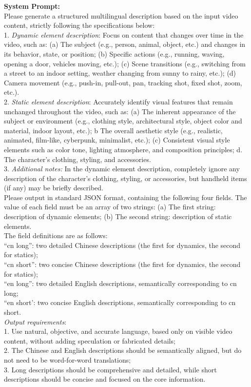 \documentclass{llmxive}
\begin{document}
\begin{tcolorbox}[
    colback=gray!10,
    colframe=gray!30,
    boxrule=0.3pt,
    arc=1.5pt,
    left=6pt,
    right=6pt,
    top=6pt,
    bottom=6pt
]
% 
\textbf{System Prompt:}
\\
Please generate a structured multilingual description based on the input video content, strictly following the specifications below:
\\
1. \textit{Dynamic element description}: Focus on content that changes over time in the video, such as: (a) The subject (e.g., person, animal, object, etc.) and changes in its behavior, state, or position; (b) Specific actions (e.g., running, waving, opening a door, vehicles moving, etc.); (c) Scene transitions (e.g., switching from a street to an indoor setting, weather changing from sunny to rainy, etc.); (d) Camera movement (e.g., push-in, pull-out, pan, tracking shot, fixed shot, zoom, etc.).
\\
2. \textit{Static element description}: Accurately identify visual features that remain unchanged throughout the video, such as: (a) The inherent appearance of the subject or environment (e.g., clothing style, architectural style, object color and material, indoor layout, etc.); b The overall aesthetic style (e.g., realistic, animated, film-like, cyberpunk, minimalist, etc.); (c) Consistent visual style elements such as color tone, lighting atmosphere, and composition principles; d. The character’s clothing, styling, and accessories.
\\
3. \textit{Additional notes:} In the dynamic element description, completely ignore any description of the character’s clothing, styling, or accessories, but handheld items (if any) may be briefly described.
\\
Please output in standard JSON format, containing the following four fields. The value of each field must be an array of two strings: (a) The first string: description of dynamic elements; (b) The second string: description of static elements.
\\
The field definitions are as follows:
\\
``cn long'': two detailed Chinese descriptions (the first for dynamics, the second for statics);
\\
``cn short'': two concise Chinese descriptions (the first for dynamics, the second for statics);
\\
``en long'': two detailed English descriptions, semantically corresponding to cn long;
\\
``en short': two concise English descriptions, semantically corresponding to cn short.
\\
\textit{Output requirements}:
\\
1. Use natural, objective, and accurate language, based only on visible video content, without adding speculation or fabricated details;
\\
2. The Chinese and English descriptions should be semantically aligned, but do not need to be word-for-word translations;
\\
3. Long descriptions should be comprehensive and detailed, while short descriptions should be concise and focused on the core information.
\end{tcolorbox}
\end{document}
